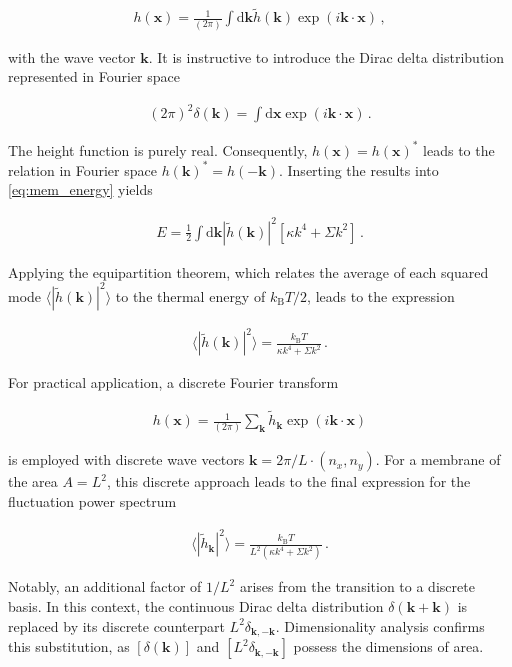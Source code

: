 \documentclass[
    11pt,
    a4paper,
    oneside,        %
    BCOR=10mm,      %
    parskip=half,   %
    listof=nototoc,   %
    bibliography=totoc %
]{scrreprt}
\begin{document}
\begin{align}
    h(\mathbf x) = \frac{1}{(2\pi)} \int \mathrm d\mathbf k 
    \tilde{h}(\mathbf k) \exp(i\mathbf k \cdot \mathbf x)\, , 
\end{align}

with the wave vector $\mathbf k$. It is instructive to introduce the Dirac delta distribution represented in Fourier space 

\begin{align}
    (2\pi)^2 \delta(\mathbf k) = \int \mathrm d \mathbf x \exp(i\mathbf k \cdot \mathbf x)\, .
\end{align}

The height function is purely real. Consequently, $h(\mathbf x) = h(\mathbf x)^*$ leads to the relation in Fourier space $h(\mathbf k)^* = h(-\mathbf k)$. Inserting the results into \cref{eq:mem_energy} yields 

\begin{align}
    E = \frac{1}{2} \int \mathrm d \mathbf k 
    |\tilde{h}(\mathbf k)|^2 \left[\kappa k^4 + \Sigma k^2 \right]\, .
\end{align}

Applying the equipartition theorem, which relates the average of each squared mode  $\langle |\tilde{h} (\mathbf k)|^2\rangle$ to the thermal energy of $k_{\mathrm B} T/2 $, leads to the expression 

\begin{align}
    \langle |\tilde{h}(\mathbf k)|^2\rangle = \frac{k_{\mathrm B}T}{\kappa k^4 + \Sigma k^2}\, .
\end{align}

For practical application, a discrete Fourier transform 

\begin{align}
    h(\mathbf{x}) = \frac{1}{(2\pi)}\sum_\mathbf{k} \tilde{h}_\mathbf{k} \exp(i \mathbf k \cdot \mathbf x) 
\end{align}

is employed with discrete wave vectors $\mathbf k = 2\pi/L\cdot (n_x,n_y)$. For a membrane of the area \mbox{$A = L^2$}, this discrete approach leads to the final expression for the fluctuation power spectrum

\begin{align}
    \langle |\tilde{h}_\mathbf{k}|^2\rangle = \frac{k_{\mathrm B}T}{L^2(\kappa k^4 + \Sigma k^2)}\, . \label{eq:cental_ben_formula_fourier}
\end{align}

Notably, an additional factor of $1/L^2$ arises from the transition to a discrete basis. In this context, the continuous Dirac delta distribution $\delta(\mathbf{k} + \mathbf{k})$ is replaced by its discrete counterpart $L^2 \delta_{\mathbf{k}, -\mathbf{k}}$. Dimensionality analysis confirms this substitution, as $[\delta(\mathbf{k})]$ and $[L^2 \delta_{\mathbf{k}, -\mathbf{k}}]$ possess the dimensions of area. 
\end{document}
